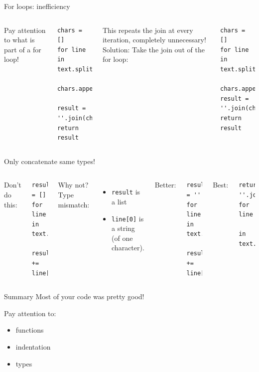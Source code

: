 \documentclass[aspectratio=169,usenames,dvipsnames]{beamer}
\begin{document}
\begin{frame}[fragile]{For loops: inefficiency}
\begin{columns}[T]
Pay attention to what is part of a for loop!
\begin{lstlisting}
chars = []
for line in text.splitlines():
    chars.append(line[0])
    result = ''.join(chars)
return result
\end{lstlisting}
\pause
This repeats the join at every iteration, completely unnecessary!
Solution: Take the join out of the for loop:
\begin{lstlisting}
chars = []
for line in text.splitlines():
    chars.append(line[0])
result = ''.join(chars)
return result
\end{lstlisting}
\end{columns}
\end{frame}

\begin{frame}[fragile]{Only concatenate same types!}
\begin{columns}[T]
Don't do this:
\begin{lstlisting}
result = []
for line in text.splitlines():
    result += line[0]
\end{lstlisting}
Why not? \pause
Type mismatch:
    \begin{itemize}
        \item \texttt{result} is a list
        \item \texttt{line[0]} is a string \\
            (of one character).
    \end{itemize}
Better:
\begin{lstlisting}
result = ''
for line in text.splitlines():
    result += line[0]
\end{lstlisting}
Best:
\begin{lstlisting}
return ''.join(line[0] for line
        in text.splitlines())
\end{lstlisting}
\end{columns}
\end{frame}


\begin{frame}{Summary}
    Most of your code was pretty good!
    
    \vspace{1em}
    Pay attention to:
    \begin{itemize}
        \item functions
        \item indentation
        \item types
    \end{itemize}
\end{frame}
\end{document}
